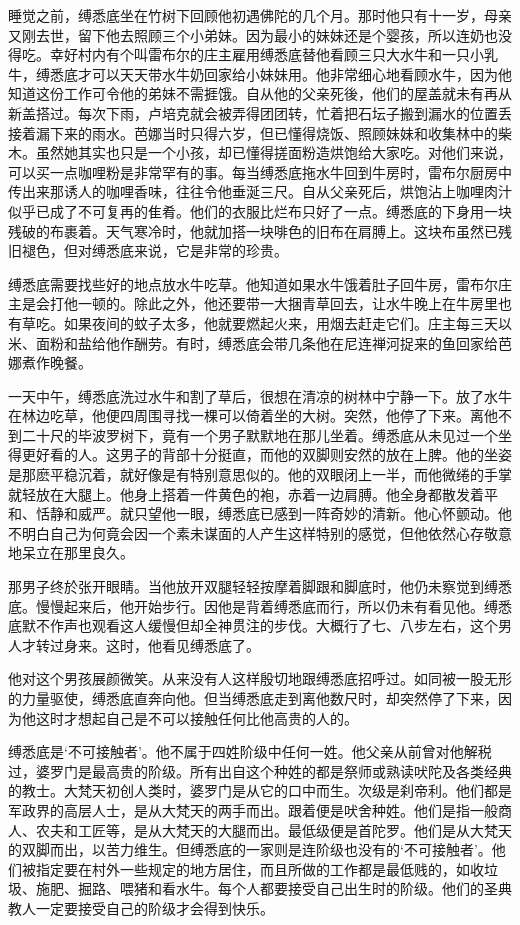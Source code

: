 \documentclass[12pt,twoside,openany]{book}
\begin{document}
睡觉之前，缚悉底坐在竹树下回顾他初遇佛陀的几个月。那时他只有十一岁，母亲又刚去世，留下他去照顾三个小弟妹。因为最小的妹妹还是个婴孩，所以连奶也没得吃。幸好村内有个叫雷布尔的庄主雇用缚悉底替他看顾三只大水牛和一只小乳牛，缚悉底才可以天天带水牛奶回家给小妹妹用。他非常细心地看顾水牛，因为他知道这份工作可令他的弟妹不需捱饿。自从他的父亲死後，他们的屋盖就未有再从新盖搭过。每次下雨，卢培克就会被弄得团团转，忙着把石坛子搬到漏水的位置丢接着漏下来的雨水。芭娜当时只得六岁，但已懂得烧饭、照顾妹妹和收集林中的柴木。虽然她其实也只是一个小孩，却已懂得搓面粉造烘饱给大家吃。对他们来说，可以买一点咖哩粉是非常罕有的事。每当缚悉底拖水牛回到牛房时，雷布尔厨房中传出来那诱人的咖哩香味，往往令他垂涎三尺。自从父亲死后，烘饱沾上咖哩肉汁似乎已成了不可复再的隹肴。他们的衣服比烂布只好了一点。缚悉底的下身用一块残破的布裹着。天气寒冷时，他就加搭一块啡色的旧布在肩膊上。这块布虽然已残旧褪色，但对缚悉底来说，它是非常的珍贵。

缚悉底需要找些好的地点放水牛吃草。他知道如果水牛饿着肚子回牛房，雷布尔庄主是会打他一顿的。除此之外，他还要带一大捆青草回去，让水牛晚上在牛房里也有草吃。如果夜间的蚊子太多，他就要燃起火来，用烟去赶走它们。庄主每三天以米、面粉和盐给他作酬劳。有时，缚悉底会带几条他在尼连禅河捉来的鱼回家给芭娜煮作晚餐。

一天中午，缚悉底洗过水牛和割了草后，很想在清凉的树林中宁静一下。放了水牛在林边吃草，他便四周围寻找一棵可以倚着坐的大树。突然，他停了下来。离他不到二十尺的毕波罗树下，竟有一个男子默默地在那儿坐着。缚悉底从未见过一个坐得更好看的人。这男子的背部十分挺直，而他的双脚则安然的放在上脾。他的坐姿是那麽平稳沉着，就好像是有特别意思似的。他的双眼闭上一半，而他微绻的手掌就轻放在大腿上。他身上搭着一件黄色的袍，赤着一边肩膊。他全身都散发着平和、恬静和威严。就只望他一眼，缚悉底已感到一阵奇妙的清新。他心怀颤动。他不明白自己为何竟会因一个素未谋面的人产生这样特别的感觉，但他依然心存敬意地呆立在那里良久。

那男子终於张开眼睛。当他放开双腿轻轻按摩着脚跟和脚底时，他仍未察觉到缚悉底。慢慢起来后，他开始步行。因他是背着缚悉底而行，所以仍未有看见他。缚悉底默不作声也观看这人缓慢但却全神贯注的步伐。大概行了七、八步左右，这个男人才转过身来。这时，他看见缚悉底了。

他对这个男孩展颜微笑。从来没有人这样殷切地跟缚悉底招呼过。如同被一股无形的力量驱使，缚悉底直奔向他。但当缚悉底走到离他数尺时，却突然停了下来，因为他这时才想起自己是不可以接触任何比他高贵的人的。

缚悉底是‘不可接触者’。他不属于四姓阶级中任何一姓。他父亲从前曾对他解税过，婆罗门是最高贵的阶级。所有出自这个种姓的都是祭师或熟读吠陀及各类经典的教士。大梵天初创人类时，婆罗门是从它的口中而生。次级是刹帝利。他们都是军政界的高层人士，是从大梵天的两手而出。跟着便是吠舍种姓。他们是指一般商人、农夫和工匠等，是从大梵天的大腿而出。最低级便是首陀罗。他们是从大梵天的双脚而出，以苦力维生。但缚悉底的一家则是连阶级也没有的‘不可接触者’。他们被指定要在村外一些规定的地方居住，而且所做的工作都是最低贱的，如收垃圾、施肥、掘路、喂猪和看水牛。每个人都要接受自己出生时的阶级。他们的圣典教人一定要接受自己的阶级才会得到快乐。
\end{document}
